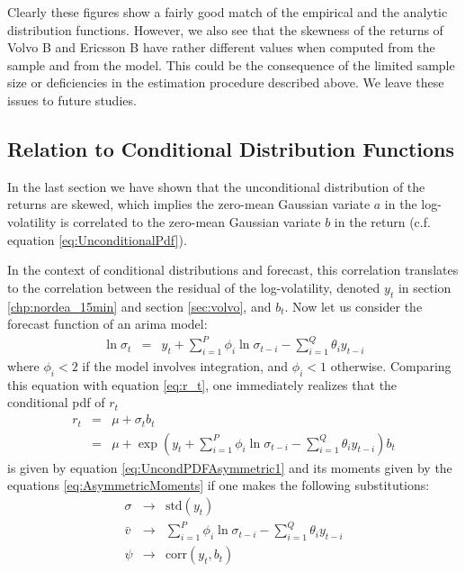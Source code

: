 Clearly these figures show a fairly good match of the empirical and
the analytic distribution functions. However, we also see that the
skewness of the returns of Volvo B and Ericsson B have rather
different values when computed from the sample and from the
model. This could be the consequence of the limited sample size or
deficiencies in the estimation procedure described above. We leave
these issues to future studies.


\subsection{Relation to Conditional Distribution Functions}
\label{sec:SV_Conditional}
In the last section we have shown that the unconditional distribution of
the returns are skewed, which implies the zero-mean Gaussian variate $a$ in the
log-volatility is correlated to the zero-mean Gaussian variate $b$ in
the return (c.f. equation \ref{eq:UnconditionalPdf}).

In the context of conditional distributions and forecast, this
correlation translates to the correlation between the residual of the
log-volatility, denoted $y_t$ in section \ref{chp:nordea_15min} and
section \ref{sec:volvo}, and $b_t$. Now let us consider the forecast
function of an \gls{arima} model:
\begin{eqnarray*}
  \ln \sigma_t &=& y_t + \sum_{i=1}^P \phi_i \ln \sigma_{t-i} -
  \sum_{i=1}^Q \theta_i y_{t-i}
\end{eqnarray*}
where $\phi_i < 2$ if the model involves integration, and $\phi_i <
1$ otherwise. Comparing this equation with equation \ref{eq:r_t}, one
immediately realizes that the conditional \gls{pdf} of $r_t$
\begin{eqnarray*}
  r_t &=& \mu + \sigma_t b_t \\
  &=& \mu + \exp\left(
    y_t + \sum_{i=1}^P \phi_i \ln \sigma_{t-i} -
    \sum_{i=1}^Q \theta_i y_{t-i}
  \right) b_t
\end{eqnarray*}
is given by equation \ref{eq:UncondPDFAsymmetric1} and its moments
given by the equations \ref{eq:AsymmetricMoments} if one makes the
following substitutions:
\begin{eqnarray*}
  \sigma &\to& \text{std}(y_t) \\
  \bar{v} &\to& \sum_{i=1}^P \phi_i \ln \sigma_{t-i} - \sum_{i=1}^Q
  \theta_i y_{t-i} \\
  \psi &\to& \text{corr}(y_t, b_t)
\end{eqnarray*}

